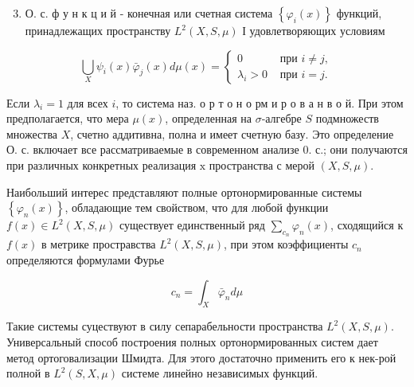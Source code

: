 \documentclass[10pt]{article}
\begin{document}
\begin{enumerate}

  \setcounter{enumi}{2}

  \item О. с. ф у н к ц и й - конечная или счетная система $\left\{\varphi_{i}(x)\right\}$ функций, принадлежащих пространству $L^{2}(X, S, \mu)$ І удовлетворяющих условиям

\end{enumerate}



\[

\bigcup_{X} \psi_{i}(x) \bar{\varphi}_{j}(x) d \mu(x)=\left\{\begin{array}{lr}

0 & \text { при } i \neq j, \\

\lambda_{i}>0 & \text { при } i=j .

\end{array}\right.

\]



Если $\lambda_{i}=1$ для всех $i$, то система наз. о р т о н о рм и р о в а н в о й. При этом предполагается, что мера $\mu(x)$, определенная на $\sigma$-алгебре $S$ подмножеств множества $X$, счетно аддитивна, полна и имеет счетную базу. Это определение О. с. включает все рассматриваемые в современном анализе 0. с.; они получаются при различных конкретных реализация $\mathrm{x}$ пространства с мерой $(X, S, \mu)$.



Наибольший интерес представляют полные ортонормированные системы $\left\{\varphi_{n}(x)\right\}$, обладающие тем свойством, что для любой функции $f(x) \in L^{2}(X, S, \mu)$ существует единственный ряд $\sum_{c_{n}} \varphi_{n}(x)$, сходящийся к $f(x)$ в метрике простравства $L^{2}(X, S, \mu)$, при этом коэффициенты $c_{n}$ определяются формулами Фурье



\[

c_{n}=\int_{X} \bar{\varphi}_{n} d \mu

\]



Такие системы суцествуют в силу сепарабельности пространства $L^{2}(X, S, \mu)$. Универсальный способ построения полных ортонормированных систем дает метод ортоговализации Шмидта. Для этого достаточно применить его к нек-рой полной в $L^{2}(S, X, \mu)$ системе линейно независимых функций.
\end{document}
